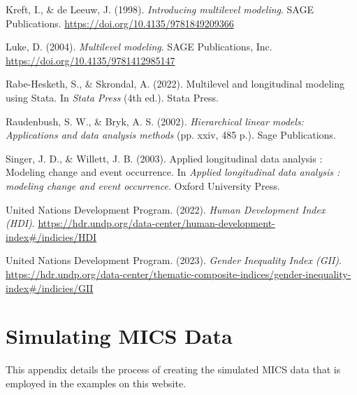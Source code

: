 \documentclass[
  letterpaper,
  DIV=11,
  numbers=noendperiod]{scrreprt}
\newlength{\cslhangindent}
\newlength{\cslentryspacingunit} %
\newenvironment{CSLReferences}[2] %
 {%
  \setlength{\parindent}{0pt}
  \ifodd #1
  \let\oldpar\par
  \def\par{\hangindent=\cslhangindent\oldpar}
  \fi
  \setlength{\parskip}{#2\cslentryspacingunit}
 }%
 {}
\begin{document}

\hypertarget{refs}{}
\begin{CSLReferences}{1}{0}
\leavevmode{}%
Kreft, I., \& de Leeuw, J. (1998). \emph{Introducing multilevel
modeling}. SAGE Publications.
\url{https://doi.org/10.4135/9781849209366}

\leavevmode{}%
Luke, D. (2004). \emph{Multilevel modeling}. SAGE Publications, Inc.
\url{https://doi.org/10.4135/9781412985147}

\leavevmode{}%
Rabe-Hesketh, S., \& Skrondal, A. (2022). Multilevel and longitudinal
modeling using {S}tata. In \emph{Stata Press} (4th ed.). Stata Press.

\leavevmode{}%
Raudenbush, S. W., \& Bryk, A. S. (2002). \emph{Hierarchical linear
models: Applications and data analysis methods} (pp. xxiv, 485 p.). Sage
Publications.

\leavevmode{}%
Singer, J. D., \& Willett, J. B. (2003). Applied longitudinal data
analysis : Modeling change and event occurrence. In \emph{Applied
longitudinal data analysis : modeling change and event occurrence}.
Oxford University Press.

\leavevmode{}%
United Nations Development Program. (2022). \emph{{Human Development
Index (HDI)}}.
\url{https://hdr.undp.org/data-center/human-development-index\#/indicies/HDI}

\leavevmode{}%
United Nations Development Program. (2023). \emph{{Gender Inequality
Index (GII)}}.
\url{https://hdr.undp.org/data-center/thematic-composite-indices/gender-inequality-index\#/indicies/GII}

\end{CSLReferences}

\cleardoublepage
{}
{}
\appendix

\hypertarget{simulating-mics-data}{%
\chapter{Simulating MICS Data}\label{simulating-mics-data}}

This appendix details the process of creating the simulated MICS data
that is employed in the examples on this website.
\end{document}
